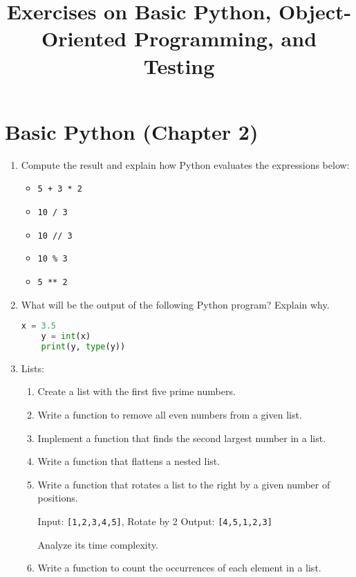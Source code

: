 \documentclass{article}
\title{Exercises on Basic Python, Object-Oriented Programming, and Testing}
\author{}
\date{}
\begin{document}
\maketitle

\section*{Basic Python (Chapter 2)}

\begin{enumerate}
    \item Compute the result and explain how Python evaluates the expressions below:
    \begin{itemize}
        \item \texttt{5 + 3 * 2}
        \item \texttt{10 / 3}
        \item \texttt{10 // 3}
        \item \texttt{10 \% 3}
        \item \texttt{5 ** 2}
    \end{itemize}
    
    \item What will be the output of the following Python program? Explain why.
    
    \begin{lstlisting}[language=Python]
    x = 3.5
    y = int(x)
    print(y, type(y))
    \end{lstlisting}
    
    \item Lists:
    
    \begin{enumerate}
        \item Create a list with the first five prime numbers.
        \item Write a function to remove all even numbers from a given list.
        \item Implement a function that finds the second largest number in a list.
        \item Write a function that flattens a nested list.
        \item Write a function that rotates a list to the right by a given number of positions.
        
        Input: \texttt{[1,2,3,4,5]}, Rotate by 2
        Output: \texttt{[4,5,1,2,3]}
        
        Analyze its time complexity.
        
        \item Write a function to count the occurrences of each element in a list.
        

\end{enumerate}
\end{enumerate}
\end{document}
